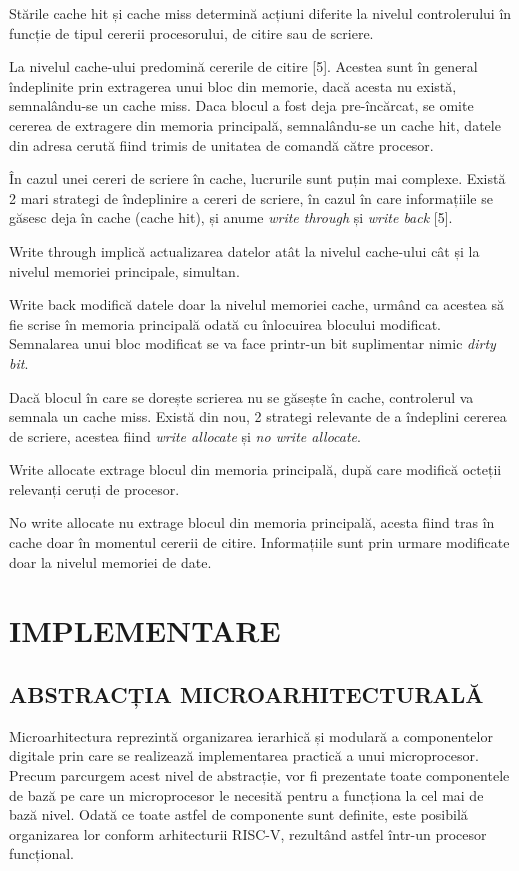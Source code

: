 \documentclass[12pt]{article}
\begin{document}
 Stările cache hit și cache miss determină acțiuni diferite la nivelul controlerului în funcție de tipul cererii procesorului, de citire sau de scriere.
 
La nivelul cache-ului predomină cererile de citire [5]. Acestea sunt în general îndeplinite prin extragerea unui bloc din memorie, dacă acesta nu există, semnalându-se un cache miss. Daca blocul a fost deja pre-încărcat, se omite cererea de extragere din memoria principală, semnalându-se un cache hit, datele din adresa cerută fiind trimis de unitatea de comandă către procesor.

În cazul unei cereri de scriere în cache, lucrurile sunt puțin mai complexe. Există 2 mari strategi de îndeplinire a cereri de scriere, în cazul în care informațiile se găsesc deja în cache (cache hit), și anume \textit{write through} și \textit{write back} [5].

Write through implică actualizarea datelor atât la nivelul cache-ului cât și la nivelul memoriei principale, simultan.

Write back modifică datele doar la nivelul memoriei cache, urmând ca acestea să fie scrise în memoria principală odată cu înlocuirea blocului modificat. Semnalarea unui bloc modificat se va face printr-un bit suplimentar nimic \textit{dirty bit}.

Dacă blocul în care se dorește scrierea nu se găsește în cache, controlerul va semnala un cache miss. Există din nou, 2 strategi relevante de a îndeplini cererea de scriere, acestea fiind \textit{write allocate} și \textit{no write allocate}.

Write allocate extrage blocul din memoria principală, după care modifică octeții relevanți ceruți de procesor.

No write allocate nu extrage blocul din memoria principală, acesta fiind tras în cache doar în momentul cererii de citire. Informațiile sunt prin urmare modificate doar la nivelul memoriei de date.


\newpage
\section{\centering IMPLEMENTARE}
\bigbreak
\subsection{ABSTRACȚIA MICROARHITECTURALĂ}
Microarhitectura reprezintă organizarea ierarhică și modulară a componentelor digitale prin care se realizează implementarea practică a unui microprocesor. Precum parcurgem acest nivel de abstracție, vor fi prezentate toate componentele de bază pe care un microprocesor le necesită pentru a funcționa la cel mai de bază nivel. Odată ce toate astfel de componente sunt definite, este posibilă organizarea lor conform arhitecturii RISC-V, rezultând astfel într-un procesor funcțional.
\end{document}
